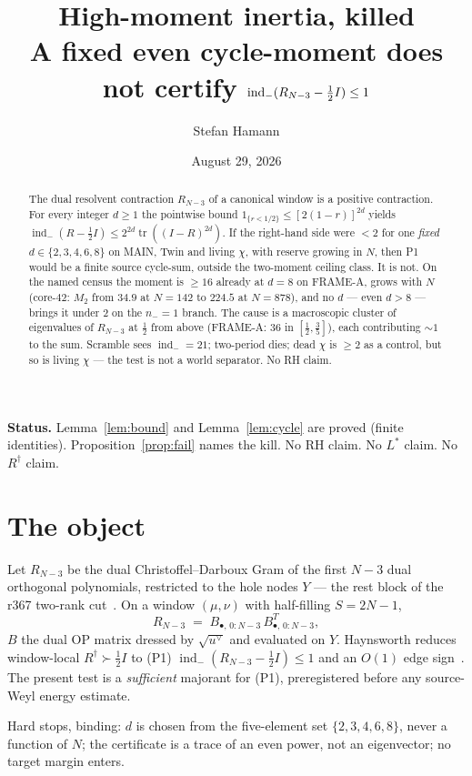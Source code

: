 \documentclass[11pt]{article}
\title{\bfseries High-moment inertia, killed\\[2mm]
\large A fixed even cycle-moment does not certify
$\indm(R_{N-3}-\tfrac12 I)\le 1$}
\author{Stefan Hamann}
\date{August 29, 2026}
\theoremstyle{remark}
\newcommand{\indm}{\operatorname{ind}_{-}}
\newcommand{\half}{\tfrac12}
\newcommand{\tr}{\operatorname{tr}}
\begin{document}
\maketitle

\begin{abstract}\noindent
The dual resolvent contraction $R_{N-3}$ of a canonical window
is a positive contraction.
For every integer $d\ge 1$ the pointwise bound
$1_{\{r<1/2\}}\le [2(1-r)]^{2d}$ yields
$\indm(R-\tfrac12 I)\le 2^{2d}\tr((I-R)^{2d})$.
If the right-hand side were $<2$ for one \emph{fixed}
$d\in\{2,3,4,6,8\}$ on MAIN, Twin and living $\chi$, with
reserve growing in $N$, then P1 would be a finite source
cycle-sum, outside the two-moment ceiling class.
It is not.
On the named census the moment is $\ge 16$ already at $d=8$
on FRAME-A, grows with $N$ (core-$42$: $M_2$ from $34.9$ at
$N=142$ to $224.5$ at $N=878$), and no $d$ --- even $d>8$ ---
brings it under $2$ on the $n_{-}=1$ branch.
The cause is a macroscopic cluster of eigenvalues of $R_{N-3}$
at $\tfrac12$ from above (FRAME-A: $36$ in $[\tfrac12,\tfrac35]$),
each contributing $\sim 1$ to the sum.
Scramble sees $\indm=21$; two-period dies; dead $\chi$ is
$\ge 2$ as a control, but so is living $\chi$ --- the test is
not a world separator.
No RH claim.
\end{abstract}

\medskip\noindent
\textbf{Status.}\enspace
Lemma~\ref{lem:bound} and Lemma~\ref{lem:cycle} are proved
(finite identities).
Proposition~\ref{prop:fail} names the kill.
No RH claim.  No $L^*$ claim.  No $R^{\dagger}$ claim.

\section{The object}\label{sec:obj}

Let $R_{N-3}$ be the dual Christoffel--Darboux Gram of the first
$N-3$ dual orthogonal polynomials, restricted to the hole nodes
$Y$ --- the rest block of the r367 two-rank cut~\cite{r367,r369}.
On a window $(\mu,\nu)$ with half-filling $S=2N-1$,
\[
R_{N-3}
\;=\;
B_{\bullet,\,0:N-3}\,B_{\bullet,\,0:N-3}^{T},
\]
$B$ the dual OP matrix dressed by $\sqrt{u^{\vee}}$ and
evaluated on $Y$.
Haynsworth reduces window-local $R^{\dagger}\succ \half I$ to
(P1) $\indm(R_{N-3}-\half I)\le 1$ and an $O(1)$ edge
sign~\cite{rdag}.
The present test is a \emph{sufficient} majorant for (P1),
preregistered before any source-Weyl energy estimate.

Hard stops, binding: $d$ is chosen from the five-element set
$\{2,3,4,6,8\}$, never a function of $N$; the certificate is a
trace of an even power, not an eigenvector; no target margin
enters.
\end{document}

